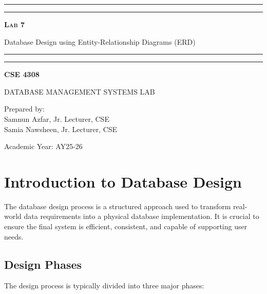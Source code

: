 \documentclass[12pt,a4paper]{article}
\newcommand{\labNo}{Lab 7}
\newcommand{\labTopic}{Database Design using Entity-Relationship Diagrams (ERD)}
\newcommand{\courseCode}{CSE 4308}
\newcommand{\courseTitleLong}{DATABASE MANAGEMENT SYSTEMS LAB}
\newcommand{\instructorName}{Samnun Azfar, Jr. Lecturer, CSE\\ Samia Nawsheen, Jr. Lecturer, CSE}
\newcommand{\academicYear}{AY25-26}
\begin{document}
\begin{titlepage}
    \centering
    \vspace*{2\baselineskip}

    \rule{14cm}{2pt}\vspace*{-0.8\baselineskip}\vspace*{1.5pt}
    \rule{14cm}{0.5pt}\vspace{2\baselineskip}

    {\Huge\bfseries\scshape \labNo\par}
    \vspace{3mm}
    {\Large \labTopic}
    \vspace{3mm}

    \rule{14cm}{0.5pt}\vspace*{-0.7\baselineskip}\vspace{2.5pt}
    \rule{14cm}{2pt}

    \vspace{2\baselineskip}

    {\Large\bfseries \courseCode\par}
    \vspace{1\baselineskip}
    {\large \courseTitleLong\par}

    \vfill
    {\normalsize Prepared by:\\ \instructorName\par}
    {\normalsize Academic Year: \academicYear\par}
\end{titlepage}

\newpage
\tableofcontents
\newpage

\section{Introduction to Database Design}

The database design process is a structured approach used to transform real-world data requirements into a physical database implementation. It is crucial to ensure the final system is efficient, consistent, and capable of supporting user needs.

\subsection{Design Phases}
The design process is typically divided into three major phases:
\end{document}
